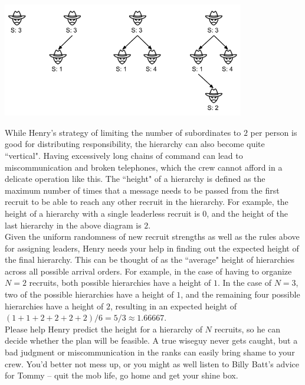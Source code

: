 \begin{center}
\includegraphics[width=300pt]{wiseguy}
\end{center}

While Henry's strategy of limiting the number of subordinates to $2$ per person is good for distributing responsibility, the hierarchy can also become quite ``vertical". Having excessively long chains of command can lead to miscommunication and broken telephones, which the crew cannot afford in a delicate operation like this. The ``height" of a hierarchy is defined as the maximum number of times that a message needs to be passed from the first recruit to be able to reach any other recruit in the hierarchy. For example, the height of a hierarchy with a single leaderless recruit is 0, and the height of the last hierarchy in the above diagram is $2$.\\

Given the uniform randomness of new recruit strengths as well as the rules above for assigning leaders, Henry needs your help in finding out the expected height of the final hierarchy. This can be thought of as the ``average" height of hierarchies across all possible arrival orders. For example, in the case of having to organize $N = 2$ recruits, both possible hierarchies have a height of $1$. In the case of $N = 3$, two of the possible hierarchies have a height of $1$, and the remaining four possible hierarchies have a height of $2$, resulting in an expected height of $(1 + 1 + 2 + 2 + 2 + 2)/6 = 5/3 \approx 1.66667$.\\

Please help Henry predict the height for a hierarchy of $N$ recruits, so he can decide whether the plan will be feasible. A true wiseguy never gets caught, but a bad judgment or miscommunication in the ranks can easily bring shame to your crew. You'd better not mess up, or you might as well listen to Billy Batt's advice for Tommy -- quit the mob life, go home and get your shine box.\\

